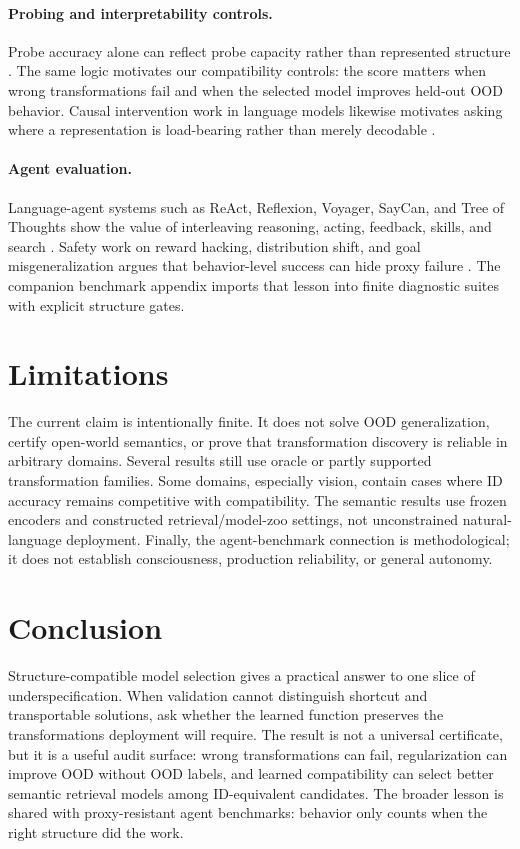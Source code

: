 \documentclass[10pt,twocolumn]{article}
\begin{document}
\paragraph{Probing and interpretability controls.}
Probe accuracy alone can reflect probe capacity rather than represented
structure \citep{hewitt2019designing}. The same logic motivates our
compatibility controls: the score matters when wrong transformations fail and
when the selected model improves held-out OOD behavior. Causal intervention
work in language models likewise motivates asking where a representation is
load-bearing rather than merely decodable \citep{meng2022locating}.

\paragraph{Agent evaluation.}
Language-agent systems such as ReAct, Reflexion, Voyager, SayCan, and Tree of
Thoughts show the value of interleaving reasoning, acting, feedback, skills, and
search \citep{yao2022react, shinn2023reflexion, wang2023voyager,
ahn2022saycan, yao2023tree}. Safety work on reward hacking, distribution shift,
and goal misgeneralization argues that behavior-level success can hide proxy
failure \citep{amodei2016concrete, langosco2022goal}. The companion benchmark
appendix imports that lesson into finite diagnostic suites with explicit
structure gates.

\section{Limitations}

The current claim is intentionally finite. It does not solve OOD
generalization, certify open-world semantics, or prove that transformation
discovery is reliable in arbitrary domains. Several results still use oracle or
partly supported transformation families. Some domains, especially vision,
contain cases where ID accuracy remains competitive with compatibility. The
semantic results use frozen encoders and constructed retrieval/model-zoo
settings, not unconstrained natural-language deployment. Finally, the
agent-benchmark connection is methodological; it does not establish
consciousness, production reliability, or general autonomy.

\section{Conclusion}

Structure-compatible model selection gives a practical answer to one slice of
underspecification. When validation cannot distinguish shortcut and
transportable solutions, ask whether the learned function preserves the
transformations deployment will require. The result is not a universal
certificate, but it is a useful audit surface: wrong transformations can fail,
regularization can improve OOD without OOD labels, and learned compatibility can
select better semantic retrieval models among ID-equivalent candidates. The
broader lesson is shared with proxy-resistant agent benchmarks: behavior only
counts when the right structure did the work.




\clearpage
\onecolumn
\appendix

\end{document}
